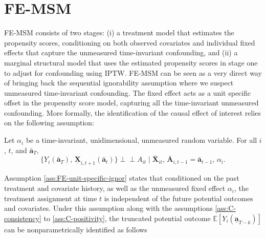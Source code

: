 \section{FE-MSM}
\label{sec:fe-msm}
FE-MSM consists of two stages: (i) a treatment model that 
estimates the propensity scores, conditioning on both observed 
covariates and individual fixed effects that capture the 
unmeasured time-invariant confounding, 
and (ii) a marginal structural model that uses the 
estimated propensity scores in stage one to adjust for 
confounding using IPTW. FE-MSM can be seen as a very direct way of 
bringing back the sequential 
ignorability assumption where we suspect unmeasured time-invariant 
confounding. The fixed effect acts as a unit specific 
offset in the propensity score model, capturing all 
the time-invariant unmeasured confounding. More formally, the identification of 
the causal effect of interest relies on the following assumption:

\begin{idassumpFE}\label{ass:FE-unit-specific-ignor}
Let $\alpha_i$ be a time-invariant, unidimensional, unmeasured random variable. For all
$i$, $t$, and $\bar{\mathbf{a}}_T$,
\[
\{ Y_i(\bar{\mathbf{a}}_T),\, \underline{\mathbf{X}}_{i,t+1}(\bar{\mathbf{a}}_t) \}
\perp\!\!\!\perp
A_{it}
\mid
\bar{\mathbf{X}}_{it},\,
\bar{\mathbf{A}}_{i,t-1} = \bar{\mathbf{a}}_{t-1},\,
\alpha_i .
\]
\end{idassumpFE}

Assumption \ref{ass:FE-unit-specific-ignor} states that conditioned on 
the past treatment and covariate history, as well as 
the unmeasured fixed effect $\alpha_i$, 
the treatment assignment at time $t$ is independent of the future 
potential outcomes and covariates. Under this assumption along with 
the assumptions \ref{ass:C-consistency} to \ref{ass:C-positivity}, the truncated potential 
outcome $\mathbb{E}[Y_i(\underline{\mathbf{a}}_{T-k})]$ can be nonparametrically identified as follows

